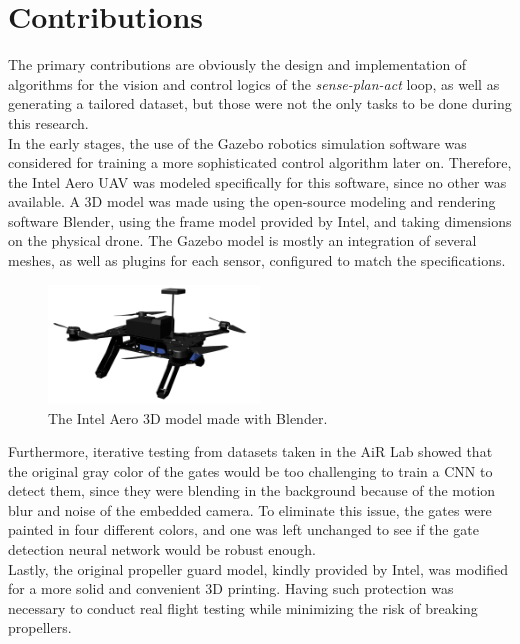 \section{Contributions}

The primary contributions are obviously the design and implementation of
algorithms for the vision and control logics of the \emph{sense-plan-act} loop,
as well as generating a tailored dataset, but those were not the only tasks to
be done during this research.\\

In the early stages, the use of the Gazebo robotics simulation software was
considered for training a more sophisticated control algorithm later on.
Therefore, the Intel Aero UAV was modeled specifically for this software,
since no other was available. A 3D model was made using the open-source
modeling and rendering software Blender, using the frame model provided by
Intel, and taking dimensions on the physical drone. The Gazebo model is mostly
an integration of several meshes, as well as plugins for each sensor, configured
to match the specifications.

\begin{figure}[h]
	\centering
	\includegraphics[width=0.5\textwidth]{figure/aero.png}
	\caption{The Intel Aero 3D model made with Blender.}
	\label{fig:aero}
\end{figure}

Furthermore, iterative testing from datasets taken in the AiR Lab showed that
the original gray color of the gates would be too challenging to train a CNN to
detect them, since they were blending in the background because of the motion
blur and noise of the embedded camera. To eliminate this issue, the gates were
painted in four different colors, and one was left unchanged to see if the gate
detection neural network would be robust enough.\\

Lastly, the original propeller guard model, kindly provided by Intel, was
modified for a more solid and convenient 3D printing. Having such protection was
necessary to conduct real flight testing while minimizing the risk of breaking
propellers.

